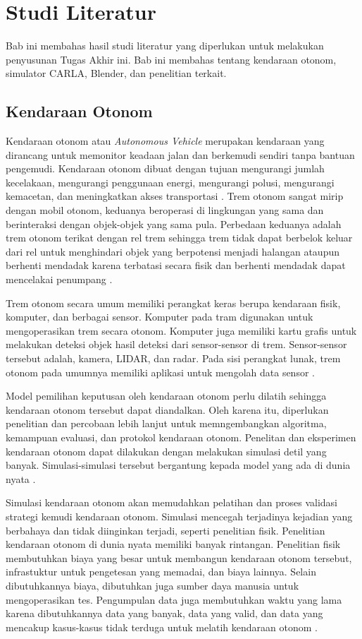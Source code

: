 \chapter{Studi Literatur}

Bab ini membahas hasil studi literatur yang diperlukan untuk melakukan
penyusunan Tugas Akhir ini. Bab ini membahas tentang kendaraan otonom, simulator
CARLA, Blender, dan penelitian terkait.

\section{Kendaraan Otonom}

Kendaraan otonom atau \textit{Autonomous Vehicle} merupakan kendaraan yang
dirancang untuk memonitor keadaan jalan dan berkemudi sendiri tanpa bantuan
pengemudi. Kendaraan otonom dibuat dengan tujuan mengurangi jumlah kecelakaan,
mengurangi penggunaan energi, mengurangi polusi, mengurangi kemacetan, dan
meningkatkan akses transportasi \parencite{av-bagloee}. Trem otonom sangat mirip
dengan mobil otonom, keduanya beroperasi di lingkungan yang sama dan
berinteraksi dengan objek-objek yang sama pula. Perbedaan keduanya adalah trem
otonom terikat dengan rel trem sehingga trem tidak dapat berbelok keluar dari
rel untuk menghindari objek yang berpotensi menjadi halangan ataupun berhenti
mendadak karena terbatasi secara fisik dan berhenti mendadak dapat mencelakai
penumpang \parencite{at-palmer}.

Trem otonom secara umum memiliki perangkat keras berupa kendaraan fisik,
komputer, dan berbagai sensor. Komputer pada tram digunakan untuk mengoperasikan
trem secara otonom. Komputer juga memiliki kartu grafis untuk melakukan deteksi
objek hasil deteksi dari sensor-sensor di trem. Sensor-sensor tersebut adalah,
kamera, LIDAR, dan radar. Pada sisi perangkat lunak, trem otonom pada
umumnya memiliki aplikasi untuk mengolah data sensor \parencite{at-palmer}.

Model pemilihan keputusan oleh kendaraan otonom perlu dilatih sehingga kendaraan
otonom tersebut dapat diandalkan. Oleh karena itu, diperlukan penelitian dan
percobaan lebih lanjut untuk memngembangkan algoritma, kemampuan evaluasi, dan
protokol kendaraan otonom. Penelitan dan eksperimen kendaraan otonom dapat
dilakukan dengan melakukan simulasi detil yang banyak. Simulasi-simulasi
tersebut bergantung kepada model yang ada di dunia nyata \parencite{av-berger}.

Simulasi kendaraan otonom akan memudahkan pelatihan dan proses validasi strategi
kemudi kendaraan otonom. Simulasi mencegah terjadinya kejadian yang berbahaya
dan tidak diinginkan terjadi, seperti penelitian fisik. Penelitian kendaraan
otonom di dunia nyata memiliki banyak rintangan. Penelitian fisik membutuhkan
biaya yang besar untuk membangun kendaraan otonom tersebut, infrastuktur untuk
pengetesan yang memadai, dan biaya lainnya. Selain dibutuhkannya biaya,
dibutuhkan juga sumber daya manusia untuk mengoperasikan tes. Pengumpulan data
juga membutuhkan waktu yang lama karena dibutuhkannya data yang banyak, data
yang valid, dan data yang mencakup kasus-kasus tidak terduga untuk melatih
kendaraan otonom \parencite{carla-dosovitskiy}.

